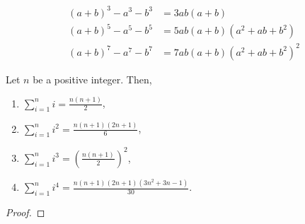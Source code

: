 \documentclass[main.tex]{subfile}
\begin{document}
\noappendicestocpagenum
\addappheadtotoc
\begin{appendix}\label{ch:appendices}

	\begin{identity}[]

	\end{identity}

	\begin{identity}
		\begin{align*}
			(a+b)^3 - a^3 - b^3 &= 3ab(a+b)\\
			(a+b)^5 - a^5 - b^5 &= 5ab(a+b)(a^2+ab+b^2)\\
			(a+b)^7 - a^7 - b^7 &= 7ab(a+b)(a^2+ab+b^2)^2
		\end{align*}
	\end{identity}

	\begin{identity}[]\label{thm:binomial-theorem}

	\end{identity}

	\begin{identity} \label{thm:binom}

	\end{identity}

	\begin{identity}

	\end{identity}

	\begin{identity}\label{id:sumofpowers}
		Let $n$ be a positive integer. Then,
			\begin{enumerate}
				\item $\displaystyle\sum\limits_{i=1}^{n} i = \frac{n(n+1)}{2}$,
				\item $\displaystyle\sum\limits_{i=1}^{n} i^2 = \frac{n(n+1)(2n+1)}{6}$,
				\item $\displaystyle\sum\limits_{i=1}^{n} i^3 = \left(\frac{n(n+1)}{2}\right)^2$,
				\item $\displaystyle\sum\limits_{i=1}^{n} i^4 = \frac{n(n+1)(2n+1)(3n^2+3n-1)}{30}$.
			\end{enumerate}
	\end{identity}

	\begin{identity}[]\label{id:sumofdif}

	\end{identity}

	\begin{proof}


\end{proof}
\end{appendix}
\end{document}
